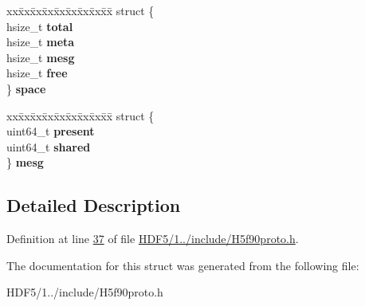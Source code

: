 \begin{DoxyCompactItemize}
\begin{tabbing}
\end{tabbing}\item 
\mbox{\label{struct_h5_o__hdr__info__t__f_a911ef838acb09605b14ee6b554eb1de1}} 
\begin{tabbing}
xx\=xx\=xx\=xx\=xx\=xx\=xx\=xx\=xx\=\kill
struct \{\\
\>hsize\_t {\bfseries total}\\
\>hsize\_t {\bfseries meta}\\
\>hsize\_t {\bfseries mesg}\\
\>hsize\_t {\bfseries free}\\
\} {\bfseries space}\\

\end{tabbing}\item 
\mbox{\label{struct_h5_o__hdr__info__t__f_af100bc1bee7135cdd547302d0ed7fcca}} 
\begin{tabbing}
xx\=xx\=xx\=xx\=xx\=xx\=xx\=xx\=xx\=\kill
struct \{\\
\>uint64\_t {\bfseries present}\\
\>uint64\_t {\bfseries shared}\\
\} {\bfseries mesg}\\

\end{tabbing}\end{DoxyCompactItemize}


\subsection{Detailed Description}


Definition at line \hyperlink{_h_d_f5_21_810_81_2include_2_h5f90proto_8h_source_l00037}{37} of file \hyperlink{_h_d_f5_21_810_81_2include_2_h5f90proto_8h_source}{H\+D\+F5/1../include/\+H5f90proto.\+h}.



The documentation for this struct was generated from the following file\+:\begin{DoxyCompactItemize}
\item 
H\+D\+F5/1../include/\+H5f90proto.\+h\end{DoxyCompactItemize}
